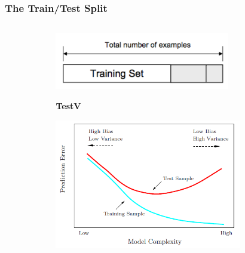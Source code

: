 \documentclass[xcolor={dvipsnames}]{beamer}
\begin{document}
\frame
{
\frametitle{The Train/Test Split}

\vspace{-.25in}

\begin{columns}

\begin{column}{.01\textwidth}
\end{column}

\begin{column}{.7\textwidth}

\vspace{-.175in}

\begin{figure}
\centering
\includegraphics[width=3in]{stuff/traintest.png}

\vspace{-.4in}
\hspace{2.05in}\textbf{Test}\hspace{.25in}\textbf{V}
\vspace{.2in}

\hspace*{-.16in}\includegraphics[width=3.215in]{stuff/complexitychoice.png}
\end{figure}
\end{column}

\begin{column}{.42\textwidth}



\end{column}
\end{columns}}
\end{document}
